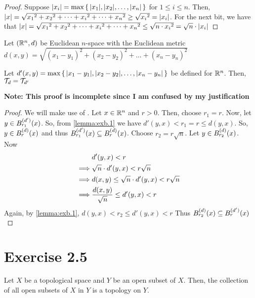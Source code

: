 \documentclass{article}
\begin{document}
\begin{proof}
    Suppose $\lvert x_i \rvert = \max\set{\lvert x_1 \rvert, \lvert x_2 \rvert, \dots, \lvert x_n \rvert}$ for $1 \leq i \leq n$.
    Then, $\lvert x \rvert = \sqrt{{x_1}^2 + {x_2}^2 + \dots + {x_i}^2 + \dots + {x_n}^2} \geq \sqrt{{x_i}^2} = \lvert x_i \rvert$.
    For the next bit, we have that $\lvert x \rvert = \sqrt{{x_1}^2 + {x_2}^2 + \dots + {x_i}^2 + \dots + {x_n}^2} \leq \sqrt{n \cdot {x_i}^2} = \sqrt n \cdot \lvert x_i \rvert$
\end{proof}

\begin{claim}
    Let $(\mathbb{R}^n, d)$ be Euclidean $n$-space with the Euclidean metric $d(x, y) = \sqrt{(x_1 - y_1)^2 + (x_2 - y_2)^2 + \dots + (x_n - y_n)^2 }$
    
    Let $d'(x, y) = \max \set{\lvert x_1 - y_1 \rvert, \lvert x_2 - y_2 \rvert, \dots, \lvert x_n - y_n \rvert }$ be 
    defined for $\mathbb{R}^n$. Then, $\mathcal{T}_{d} = \mathcal{T}_{d'}$
\end{claim}
\textbf{Note: This proof is incomplete since I am confused by my justification}
\begin{proof}
    We will make use of . Let $x \in \mathbb{R}^n$ and $r > 0$. Then, choose $r_1 = r$. Now,
    let $y \in  B_{r_1}^{(d')} (x) $. So, from \cref{lemma:exb.1} we have $d'(y, x) < r_1 = r \leq d(y, x)$.
    So, $y \in  B_{r}^{(d)} (x) $ and thus $ B_{r_1}^{(d')} (x)  \subseteq  B_{r}^{(d)} (x) $.
    Choose $r_2 = r\sqrt{n}$. Let $y \in  B_{r_2}^{(d)} (x) $. 
    Now
    \begin{align*}
        &d'(y, x) < r \\
        \implies &\sqrt{n} \cdot d'(y, x) < r\sqrt{n} \\
        \implies &d(x, y) \leq \sqrt{n} \cdot d'(y, x) < r\sqrt{n} \\
        \implies &\f {d(x,y)}/\sqrt{n}. \leq d'(y, x) < r
    \end{align*}
    Again, by \cref{lemma:exb.1}, $d(y, x) < r_2 \leq d'(y, x) < r$ Thus $ B_{r_2}^{(d)} (x)  \subseteq  B_{r}^{(d')} (x) $
\end{proof}


\section{Exercise 2.5}

\begin{claim}
    Let $X$ be a topological space and $Y$ be an open subset of $X$. Then, the 
    collection of all open subsets of $X$ in $Y$ is a topology on $Y$.
\end{claim}
\end{document}
